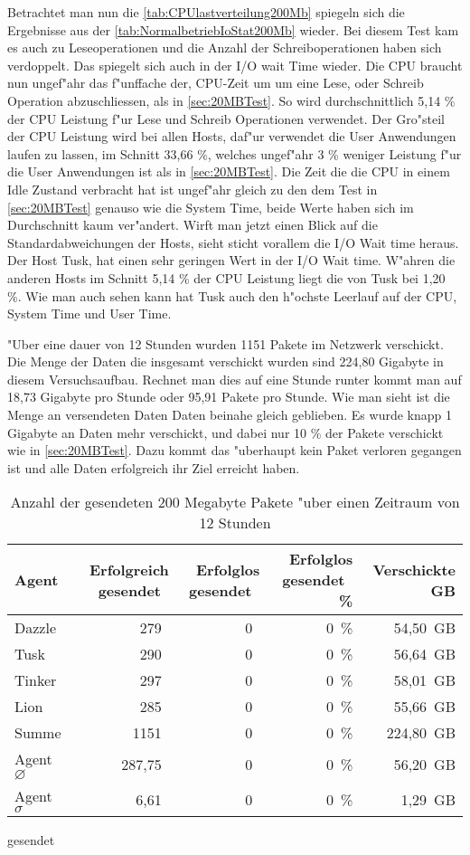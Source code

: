 Betrachtet man nun die \cref{tab:CPUlastverteilung200Mb} spiegeln sich die Ergebnisse aus der \cref{tab:NormalbetriebIoStat200Mb} wieder. %
Bei diesem Test kam es auch zu Leseoperationen und die Anzahl der Schreiboperationen haben sich verdoppelt. %
Das spiegelt sich auch in der I/O wait Time wieder. Die CPU braucht nun ungef"ahr das f"unffache der, CPU-Zeit um %
um eine Lese, oder Schreib Operation abzuschliessen, als in \cref{sec:20MBTest}. %
So wird durchschnittlich 5,14 \% der CPU Leistung f"ur Lese und Schreib Operationen verwendet. Der Gro"steil der CPU Leistung wird %
bei allen Hosts, daf"ur verwendet die User Anwendungen laufen zu lassen, im Schnitt 33,66 \%, welches %
ungef"ahr 3 \% weniger Leistung f"ur die User Anwendungen ist als in \cref{sec:20MBTest}. Die Zeit die die CPU in einem Idle Zustand verbracht %
hat ist ungef"ahr gleich zu den dem Test in \cref{sec:20MBTest} genauso wie die System Time, beide Werte haben sich im Durchschnitt kaum ver"andert. 
Wirft man jetzt einen Blick auf die Standardabweichungen der Hosts, sieht sticht vorallem die I/O Wait time %
heraus. Der Host Tusk, hat einen sehr geringen Wert in der I/O Wait time. W"ahren die anderen Hosts im Schnitt 5,14 \% der CPU Leistung %
liegt die von Tusk bei 1,20 \%. Wie man auch sehen kann hat Tusk auch den h"ochste Leerlauf auf der CPU, System Time und User Time. %

"Uber eine dauer von 12 Stunden wurden 1151 Pakete im Netzwerk verschickt. Die Menge der Daten die insgesamt verschickt wurden sind 224,80 Gigabyte in diesem Versuchsaufbau. %
Rechnet man dies auf eine Stunde runter kommt man auf 18,73 Gigabyte pro Stunde oder 95,91 Pakete pro Stunde. Wie man sieht ist die Menge an versendeten Daten %
Daten beinahe gleich geblieben. Es wurde knapp 1 Gigabyte an Daten mehr verschickt, und dabei nur 10 \% der Pakete verschickt wie in \cref{sec:20MBTest}. 
Dazu kommt das "uberhaupt kein Paket verloren gegangen ist und alle Daten erfolgreich ihr Ziel erreicht haben. 

\begin{table}
\centering
\begin{tabular}{l%
 r<{\,}%
 r<{\,}%
 r<{\,\%}%
 r<{\,GB}%
}
Agent  				& Erfolgreich gesendet			& Erfolglos gesendet			& Erfolglos gesendet	& Verschickte	\\
\hline
Dazzle 				& 279			 		& 0					& 0			& 54,50			\\
Tusk 				& 290					& 0					& 0			& 56,64			\\
Tinker				& 297					& 0					& 0			& 58,01			\\
Lion				& 285					& 0					& 0			& 55,66			\\ 
Summe				& 1151					& 0					& 0 			& 224,80		\\
Agent $\diameter $  		& 287,75				& 0				 	& 0			& 56,20 		\\   
Agent $\sigma $			& 6,61		 			& 0					& 0      		& 1,29		\\
\end{tabular}
gesendet\caption{Anzahl der gesendeten 200 Megabyte Pakete "uber einen Zeitraum von 12 Stunden}
\label{tab:VerschickteDaten200Mb}
\end{table}



